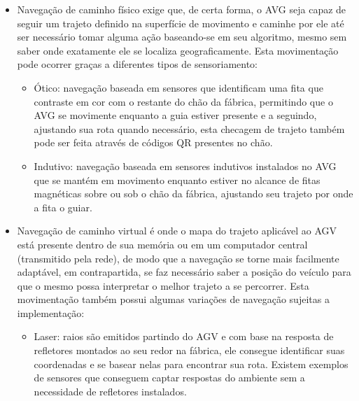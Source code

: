 \begin{itemize}

        \item Navegação de caminho físico exige que, de certa forma, o AVG seja
                capaz de seguir um trajeto definido na superfície de movimento
                e caminhe por ele até ser necessário tomar alguma ação
                baseando-se em seu algoritmo, mesmo sem saber onde exatamente
                ele se localiza geograficamente. Esta movimentação pode ocorrer
                graças a diferentes tipos de sensoriamento:

        \begin{itemize}
                \item Ótico: navegação baseada em sensores que identificam uma
                        fita que contraste em cor com o restante do chão da
                        fábrica, permitindo que o AVG se movimente enquanto a
                        guia estiver presente e a seguindo, ajustando sua rota
                        quando necessário, esta checagem de trajeto também pode
                        ser feita através de códigos QR presentes no chão.

                \item Indutivo: navegação baseada em sensores indutivos
                        instalados no AVG que se mantém em movimento enquanto
                        estiver no alcance de fitas magnéticas sobre ou sob o
                        chão da fábrica, ajustando seu trajeto por onde a fita
                        o guiar.

        \end{itemize}

        \item Navegação de caminho virtual é onde o mapa do trajeto aplicável
                ao AGV está presente dentro de sua memória ou em um computador
                central (transmitido pela rede), de modo que a navegação se
                torne mais facilmente adaptável, em contrapartida, se faz
                necessário saber a posição do veículo para que o mesmo possa
                interpretar o melhor trajeto a se percorrer. Esta movimentação
                também possui algumas variações de navegação sujeitas a
                implementação:

        \begin{itemize}

                \item Laser: raios são emitidos partindo do AGV e com base na
                        resposta de refletores montados ao seu redor na
                        fábrica, ele consegue identificar suas coordenadas e se
                        basear nelas para encontrar sua rota. Existem exemplos
                        de sensores que conseguem captar respostas do ambiente
                        sem a necessidade de refletores instalados.


\end{itemize}
\end{itemize}
